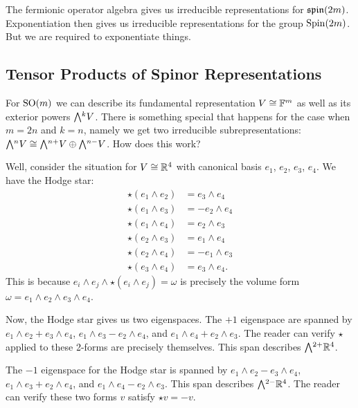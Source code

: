 \M
The fermionic operator algebra gives us irreducible representations for
$\operatorname{\mathfrak{spin}}(2m)$. Exponentiation then gives us irreducible representations
for the group $\operatorname{Spin}(2m)$. But we are required to exponentiate things.

\subsection{Tensor Products of Spinor Representations}

\M
For $\operatorname{SO}(m)$ we can describe its fundamental representation
$V\cong\mathbb{F}^{m}$ as well as its exterior powers $\Exterior^{k}V$. There is
something special that happens for the case when $m=2n$ and $k=n$,
namely we get two irreducible subrepresentations:
$\Exterior^{n}V\iso\Exterior^{n+}V\oplus\Exterior^{n-}V$.
How does this work?

Well, consider the situation for $V\cong\mathbb{R}^{4}$ with canonical basis
$e_{1}$, $e_{2}$, $e_{3}$, $e_{4}$. We have the Hodge star:
\begin{subequations}
\begin{align}
\star(e_{1}\wedge e_{2}) &= e_{3}\wedge e_{4}\\
\star(e_{1}\wedge e_{3}) &= -e_{2}\wedge e_{4}\\
\star(e_{1}\wedge e_{4}) &= e_{2}\wedge e_{3}\\
\star(e_{2}\wedge e_{3}) &= e_{1}\wedge e_{4}\\
\star(e_{2}\wedge e_{4}) &= -e_{1}\wedge e_{3}\\
\star(e_{3}\wedge e_{4}) &= e_{3}\wedge e_{4}.
\end{align}
\end{subequations}
This is because $e_{i}\wedge e_{j}\wedge\star(e_{i}\wedge e_{j})=\omega$
is precisely the volume form $\omega = e_{1}\wedge e_{2}\wedge e_{3}\wedge e_{4}$.

Now, the Hodge star gives us two eigenspaces. The $+1$ eigenspace are
spanned by $e_{1}\wedge e_{2} + e_{3}\wedge e_{4}$,
$e_{1}\wedge e_{3} -e_{2}\wedge e_{4}$,
and $e_{1}\wedge e_{4} + e_{2}\wedge e_{3}$.
The reader can verify $\star$ applied to these 2-forms are precisely
themselves. This span describes $\Exterior^{2+}\RR^{4}$.

The $-1$ eigenspace for the Hodge star is spanned by
$e_{1}\wedge e_{2} - e_{3}\wedge e_{4}$,
$e_{1}\wedge e_{3} + e_{2}\wedge e_{4}$, and
$e_{1}\wedge e_{4} - e_{2}\wedge e_{3}$. This span describes
$\Exterior^{2-}\RR^{4}$. The reader can verify these two forms $v$
satisfy $\star v = - v$.

